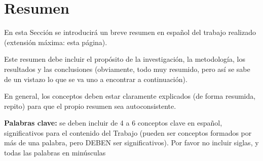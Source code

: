 \chapter{Resumen}

En esta Sección se introducirá un breve resumen en español del trabajo realizado (extensión máxima: esta página).

\vspace{\baselineskip}

Este resumen debe incluir el propósito de la investigación, la metodología, los resultados y las conclusiones (obviamente, todo muy resumido, pero así se sabe de un vistazo lo que se va uno a encontrar a continuación).

\vspace{\baselineskip}

En general, los conceptos deben estar claramente explicados (de forma resumida, repito) para que el propio resumen sea autoconsistente.

\vspace{0.5cm}

{\bf Palabras clave:} se deben incluir de 4 a 6 conceptos clave en español, significativos para el contenido del Trabajo (pueden ser conceptos formados por más de una palabra, pero DEBEN ser significativos). Por favor no incluir siglas, y todas las palabras en minúsculas